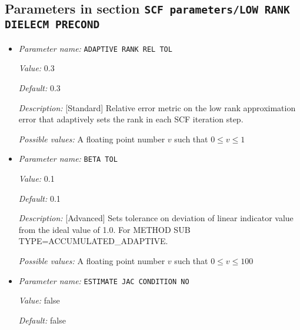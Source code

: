 \subsection{Parameters in section \tt SCF parameters/LOW RANK DIELECM PRECOND}
\label{parameters:SCF_20parameters/LOW_20RANK_20DIELECM_20PRECOND}

\begin{itemize}
\item {\it Parameter name:} {\tt ADAPTIVE RANK REL TOL}
\label{parameters:SCF parameters/LOW RANK DIELECM PRECOND/ADAPTIVE RANK REL TOL}
\label{parameters:SCF_20parameters/LOW_20RANK_20DIELECM_20PRECOND/ADAPTIVE_20RANK_20REL_20TOL}


{\it Value:} 0.3


{\it Default:} 0.3


{\it Description:} [Standard] Relative error metric on the low rank approximation error that adaptively sets the rank in each SCF iteration step.


{\it Possible values:} A floating point number $v$ such that $0 \leq v \leq 1$
\item {\it Parameter name:} {\tt BETA TOL}
\label{parameters:SCF parameters/LOW RANK DIELECM PRECOND/BETA TOL}
\label{parameters:SCF_20parameters/LOW_20RANK_20DIELECM_20PRECOND/BETA_20TOL}


{\it Value:} 0.1


{\it Default:} 0.1


{\it Description:} [Advanced] Sets tolerance on deviation of linear indicator value from the ideal value of 1.0. For METHOD SUB TYPE=ACCUMULATED\_ADAPTIVE.


{\it Possible values:} A floating point number $v$ such that $0 \leq v \leq 100$
\item {\it Parameter name:} {\tt ESTIMATE JAC CONDITION NO}
\label{parameters:SCF parameters/LOW RANK DIELECM PRECOND/ESTIMATE JAC CONDITION NO}
\label{parameters:SCF_20parameters/LOW_20RANK_20DIELECM_20PRECOND/ESTIMATE_20JAC_20CONDITION_20NO}


{\it Value:} false


{\it Default:} false



\end{itemize}
